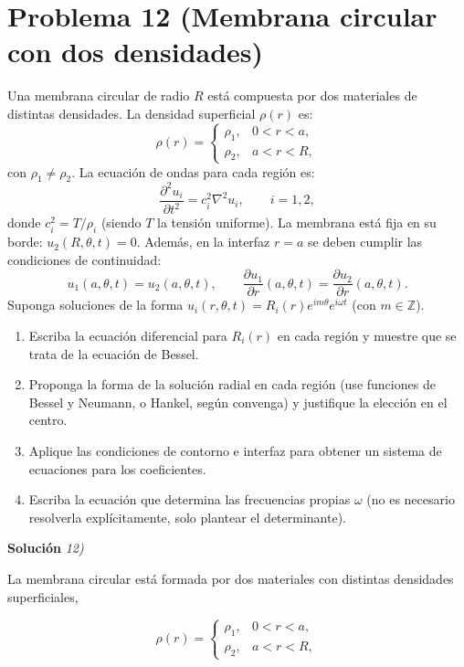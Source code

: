 \documentclass[12pt]{article}
\begin{document}
\section*{Problema 12 (Membrana circular con dos densidades)}
Una membrana circular de radio \(R\) está compuesta por dos materiales de distintas densidades. La densidad superficial \(\rho(r)\) es:
\[
\rho(r) = 
\begin{cases}
\rho_1, & 0 < r < a, \\
\rho_2, & a < r < R,
\end{cases}
\]
con \(\rho_1 \neq \rho_2\). La ecuación de ondas para cada región es:
\[
\frac{\partial^2 u_i}{\partial t^2} = c_i^2 \nabla^2 u_i, \qquad i = 1, 2,
\]
donde \(c_i^2 = T/\rho_i\) (siendo \(T\) la tensión uniforme). La membrana está fija en su borde: \(u_2(R, \theta, t) = 0\). Además, en la interfaz \(r = a\) se deben cumplir las condiciones de continuidad:
\[
u_1(a, \theta, t) = u_2(a, \theta, t), \qquad \frac{\partial u_1}{\partial r}(a, \theta, t) = \frac{\partial u_2}{\partial r}(a, \theta, t).
\]
Suponga soluciones de la forma \(u_i(r, \theta, t) = R_i(r) e^{i m \theta} e^{i \omega t}\) (con \(m \in \mathbb{Z}\)).
\begin{enumerate}
    \item[(a)] Escriba la ecuación diferencial para \(R_i(r)\) en cada región y muestre que se trata de la ecuación de Bessel.
    \item[(b)] Proponga la forma de la solución radial en cada región (use funciones de Bessel y Neumann, o Hankel, según convenga) y justifique la elección en el centro.
    \item[(c)] Aplique las condiciones de contorno e interfaz para obtener un sistema de ecuaciones para los coeficientes.
    \item[(d)] Escriba la ecuación que determina las frecuencias propias \(\omega\) (no es necesario resolverla explícitamente, solo plantear el determinante).
\end{enumerate}

\vspace{0.5cm}
{\bf Soluci\'on }{\em 12)}
\vspace{0.5cm}

La membrana circular está formada por dos materiales con distintas densidades superficiales,

\[
\rho(r)=
\begin{cases}
\rho_1, & 0<r<a,\\
\rho_2, & a<r<R,
\end{cases}
\]
\end{document}
